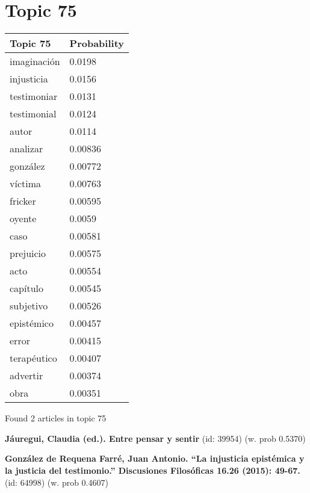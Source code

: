 \documentclass{article}
\begin{document}
\section*{Topic 75}\vfill
\begin{tabular}{ll}
\toprule
    Topic 75 & Probability \\
\midrule
 imaginación &      0.0198 \\
  injusticia &      0.0156 \\
 testimoniar &      0.0131 \\
 testimonial &      0.0124 \\
       autor &      0.0114 \\
    analizar &     0.00836 \\
    gonzález &     0.00772 \\
     víctima &     0.00763 \\
     fricker &     0.00595 \\
      oyente &      0.0059 \\
        caso &     0.00581 \\
   prejuicio &     0.00575 \\
        acto &     0.00554 \\
    capítulo &     0.00545 \\
   subjetivo &     0.00526 \\
  epistémico &     0.00457 \\
       error &     0.00415 \\
 terapéutico &     0.00407 \\
    advertir &     0.00374 \\
        obra &     0.00351 \\
\bottomrule
\end{tabular}

\vfill
Found 2 articles in topic 75
\vfill

\textbf{Jáuregui, Claudia (ed.). Entre pensar y sentir} (id: 39954)
 (w. prob 0.5370)
\vfill

\textbf{González de Requena Farré, Juan Antonio. “La injusticia epistémica y la justicia del testimonio.” Discusiones Filosóficas 16.26 (2015): 49-67.} (id: 64998)
 (w. prob 0.4607)

\vfill
\newpage


\centering
\thispagestyle{empty}
\end{document}
